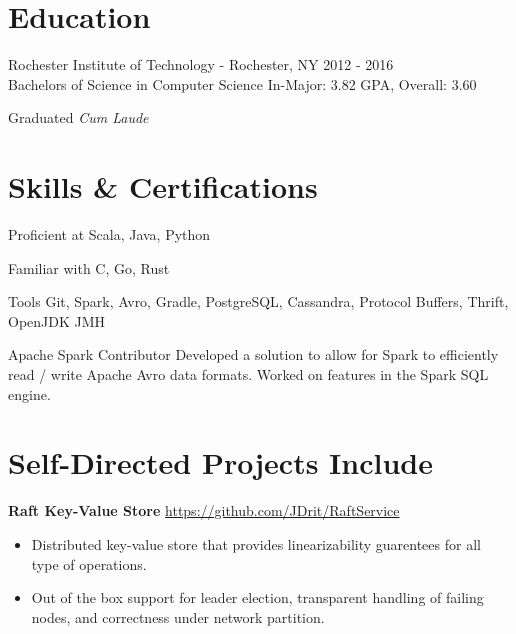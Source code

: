 \documentclass[overlapped,line]{resume}
\newcommand{\rurl}[1]{\hfill {\footnotesize \url{#1}}}
\begin{document}
\begin{resume}
\section{\mysidestyle Education}

  \begin{compactdesc}
    \item[Rochester Institute of Technology] - Rochester, NY \hfill {2012 - 2016} \\
      Bachelors of Science in Computer Science \hfill {In-Major: 3.82 GPA, Overall: 3.60} \\
      \vspace{-4mm}
      \begin{flushright} Graduated \textit{Cum Laude} \end{flushright}
  \end{compactdesc}
  \vspace{-6mm}
  
\section{\mysidestyle Skills \& Certifications}

  \begin{compactdesc}
  \item[Proficient at] \small Scala, Java, Python
  \item[Familiar with] \small C, Go, Rust
  \item[Tools] \small Git, Spark, Avro, Gradle, PostgreSQL, Cassandra, Protocol Buffers, Thrift,
    OpenJDK JMH
  \item[Apache Spark Contributor] Developed a solution to allow for Spark to efficiently read /
    write Apache Avro data formats. Worked on features in the Spark SQL engine.
  \end{compactdesc}

\section{\mysidestyle Self-Directed Projects Include}

  \textbf{Raft Key-Value Store} \rurl{https://github.com/JDrit/RaftService}
  \begin{itemize}
    \item Distributed key-value store that provides linearizability guarentees for all type of
      operations.
    \item Out of the box support for leader election, transparent handling of failing nodes, and
      correctness under network partition.
  \end{itemize}


\end{resume}
\end{document}

